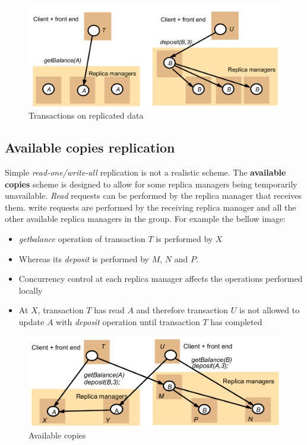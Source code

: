\begin{figure}[!h]
    \centering
    \includegraphics[width=.70\linewidth]{images/roleGroupCommunication/TransactionsOnReplicatedData.png}
    \caption{Transactions on replicated data}
\end{figure}

\subsection{Available copies replication}
Simple \textit{read-one/write-all} replication is not a realistic scheme. The \textbf{available copies} scheme is designed to allow for some replica managers being temporarily unavailable. \textit{Read} requests can be performed by the replica manager that receives them. write requests are performed by the receiving replica manager and all the other available replica managers in the group. For example the bellow image:
\begin{itemize}
    \item \textit{getbalance} operation of transaction \(T\) is performed by \(X\)
    \item Whereas its \textit{deposit} is performed by \(M\), \(N\) and \(P\).
    \item Concurrency control at each replica manager affects the operations performed locally
    \item At \(X\), transaction \(T\) has read \(A\) and therefore transaction \(U\) is not allowed to update \(A\) with \textit{deposit} operation until transaction \(T\) has completed
\end{itemize}

\begin{figure}[!h]
    \centering
    \includegraphics[width=.70\linewidth]{images/roleGroupCommunication/AvailableCopies.png}
    \caption{Available copies}
\end{figure}

